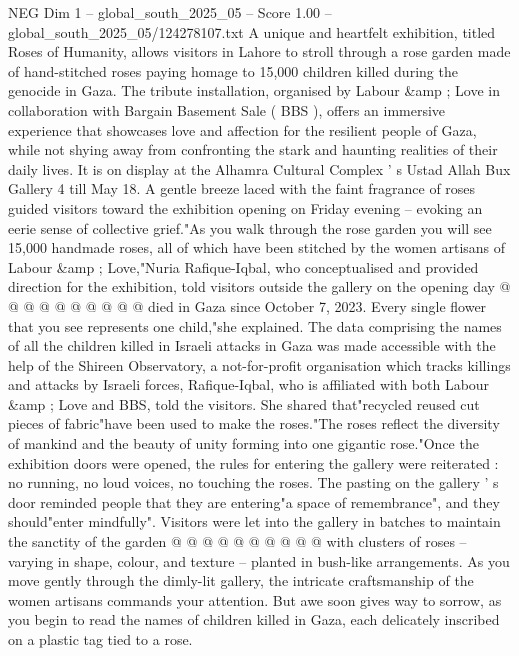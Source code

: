 \begin{textsample}{NEG Dim 1 – global\_south\_2025\_05 – Score 1.00 – global\_south\_2025\_05/124278107.txt}  \label{ex:f1_neg_171}
A unique and heartfelt exhibition, titled Roses of Humanity, allows visitors in Lahore to stroll through a rose garden made of hand-stitched roses paying homage to 15,000 children killed during the genocide in Gaza.
The tribute installation, organised by Labour \&amp ; Love in collaboration with Bargain Basement Sale ( BBS ), offers an immersive experience that showcases love and affection for the resilient people of Gaza, while not shying away from confronting the stark and haunting realities of their daily lives.
It is on display at the Alhamra Cultural Complex ' s Ustad Allah Bux Gallery 4 till May 18.
A gentle breeze laced with the faint fragrance of roses guided visitors toward the exhibition opening on Friday evening -- evoking an eerie sense of collective grief."As you walk through the rose garden you will see 15,000 handmade roses, all of which have been stitched by the women artisans of Labour \&amp ; Love,"Nuria Rafique-Iqbal, who conceptualised and provided direction for the exhibition, told visitors outside the gallery on the opening day @ @ @ @ @ @ @ @ @ @ died in Gaza since October 7, 2023.
Every single flower that you see represents one child,"she explained.
The data comprising the names of all the children killed in Israeli attacks in Gaza was made accessible with the help of the Shireen Observatory, a not-for-profit organisation which tracks killings and attacks by Israeli forces, Rafique-Iqbal, who is affiliated with both Labour \&amp ; Love and BBS, told the visitors.
She shared that"recycled reused cut pieces of fabric"have been used to make the roses."The roses reflect the diversity of mankind and the beauty of unity forming into one gigantic rose."Once the exhibition doors were opened, the rules for entering the gallery were reiterated : no running, no loud voices, no touching the roses.
The pasting on the gallery ' s door reminded people that they are entering"a space of remembrance", and they should"enter mindfully".
Visitors were let into the gallery in batches to maintain the sanctity of the garden @ @ @ @ @ @ @ @ @ @ with clusters of roses -- varying in shape, colour, and texture -- planted in bush-like arrangements.
As you move gently through the dimly-lit gallery, the intricate craftsmanship of the women artisans commands your attention.
But awe soon gives way to sorrow, as you begin to read the names of children killed in Gaza, each delicately inscribed on a plastic tag tied to a rose.

\end{textsample}
